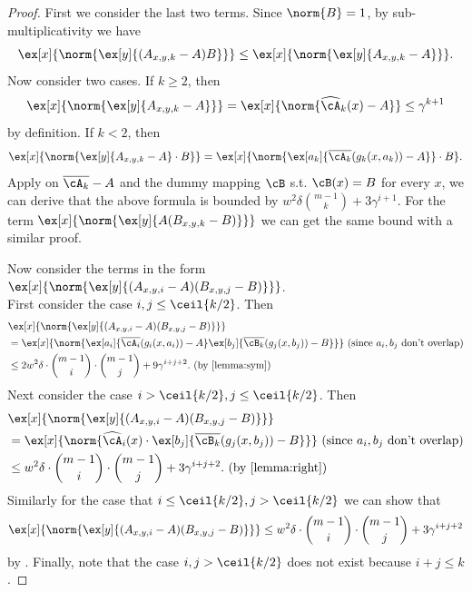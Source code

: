 \begin{proof}
First we consider the last two terms. Since $\norm{B}=1$, by sub-multiplicativity we have 
$$\ex[x]{\norm{\ex[y]{(A_{x,y,k}-A)B}}}\le \ex[x]{\norm{\ex[y]{A_{x,y,k}-A}}}.$$
Now consider two cases. If $k\ge 2$, then 
$$\ex[x]{\norm{\ex[y]{A_{x,y,k}-A}}}=\ex[x]{\norm{\widehat{\cA}_k(x)-A}}\le \gamma^{k+1}$$ by definition. If $k<2$, then 
$$\ex[x]{\norm{\ex[y]{A_{x,y,k}-A}\cdot B}}=\ex[x]{\norm{\ex[a_k]{\overline{\cA_k}(g_k(x,a_k))-A}}\cdot B}.$$
Apply  on $\overline{\cA_k}-A$ and the dummy mapping $\cB$ s.t. $\cB(x)=B$ for every $x$, we can derive that the above formula is bounded by $w^2\delta\binom{m-1}{k}+3\gamma^{i+1}$. For the term $\ex[x]{\norm{\ex[y]{A(B_{x,y,k}-B)}}}$ we can get the same bound with a similar proof.

Now consider the terms in the form $\ex[x]{\norm{\ex[y]{(A_{x,y,i}-A)(B_{x,y,j}-B)}}}$. \\
First consider the case $i,j\le\ceil{k/2}$. Then
\begin{align*}
&\ex[x]{\norm{\ex[y]{(A_{x,y,i}-A)(B_{x,y,j}-B)}}}\\
&=\ex[x]{\norm{\ex[a_i]{\overline{\cA_i}(g_i(x,a_i))-A}\ex[b_j]{\overline{\cB_k}(g_j(x,b_j))-B}}}\textrm{ (since }a_i,b_j\textrm{ don't overlap)}\\
&\le 2w^2\delta \cdot \binom{m-1}{i}\cdot\binom{m-1}{j}+9\gamma^{i+j+2}.\textrm{ (by \Cref{lemma:sym})}
\end{align*}
Next consider the case $i>\ceil{k/2},j\le \ceil{k/2}$. Then 
\begin{align*}
&\ex[x]{\norm{\ex[y]{(A_{x,y,i}-A)(B_{x,y,j}-B)}}}\\
&=\ex[x]{\norm{\widehat{\cA}_i(x)\cdot\ex[b_j]{\overline{\cB_k}(g_j(x,b_j))-B}}}\textrm{ (since }a_i,b_j\textrm{ don't overlap)}\\
&\le w^2\delta \cdot \binom{m-1}{i}\cdot\binom{m-1}{j}+3\gamma^{i+j+2}.\textrm{ (by \Cref{lemma:right})}
\end{align*}
Similarly for the case that $i\le \ceil{k/2},j>\ceil{k/2}$ we can show that 
$$\ex[x]{\norm{\ex[y]{(A_{x,y,i}-A)(B_{x,y,j}-B)}}}\le w^2\delta \cdot \binom{m-1}{i}\cdot\binom{m-1}{j}+3\gamma^{i+j+2}$$
by . Finally, note that the case $i,j>\ceil{k/2}$ does not exist because $i+j\le k$. 


\end{proof}
